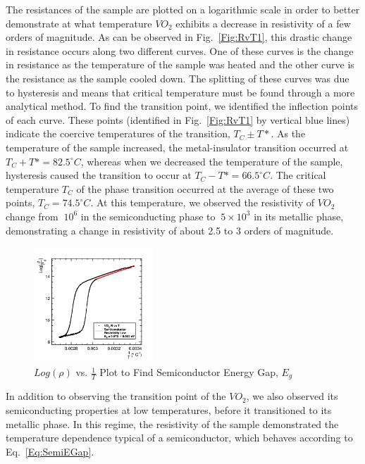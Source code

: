 \documentclass[%
 reprint,
 amsmath,amssymb,
 aps,
 pra,
]{revtex4-1}
\begin{document}
The resistances of the sample are plotted on a logarithmic scale in order to better demonstrate at what temperature $VO_{2}$ exhibits a decrease in resistivity of a few orders of magnitude. As can be observed in Fig.~\ref{Fig:RvT1}, this drastic change in resistance occurs along two different curves. One of these curves is the change in resistance as the temperature of the sample was heated and the other curve is the resistance as the sample cooled down. The splitting of these curves was due to hysteresis and means that critical temperature must be found through a more analytical method. To find the transition point, we identified the inflection points of each curve. These points (identified in Fig.~\ref{Fig:RvT1} by vertical blue lines) indicate the coercive temperatures of the transition, $T_{C} \pm T*$. As the temperature of the sample increased, the metal-insulator transition occurred at $T_{C} + T* = 82.5 ^\circ C$, whereas when we decreased the temperature of the sample, hysteresis caused the transition to occur at $T_{C} - T* = 66.5 ^\circ C$. The critical temperature $T_{C}$ of the phase transition occurred at the average of these two points, $T_{C} = 74.5^\circ C$. At this temperature, we observed the resistivity of $VO_{2}$ change from $~10^{6}$ in the semiconducting phase to $~5 \times 10^3$ in its metallic phase, demonstrating a change in resistivity of about 2.5 to 3 orders of magnitude.

\begin{figure}[H]
	\centering
	\includegraphics[width=0.4\textwidth]{VO2_LogRvTInv.png}
	\caption{$Log(\rho)$ vs. $\frac{1}{T}$ Plot to Find Semiconductor Energy Gap, $E_{g}$}
	\label{Fig:RvT2}
\end{figure}

In addition to observing the transition point of the $VO_{2}$, we also observed its semiconducting properties at low temperatures, before it transitioned to its metallic phase. In this regime, the resistivity of the sample demonstrated the temperature dependence typical of a semiconductor, which behaves according to Eq.~\ref{Eq:SemiEGap}.
\end{document}
